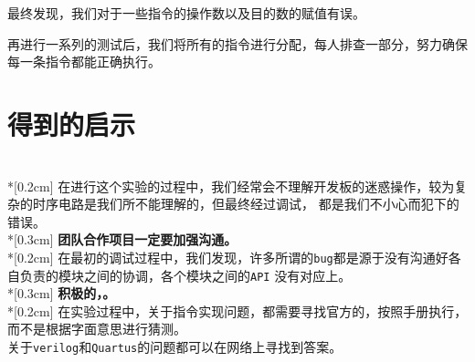 最终发现，我们对于一些指令的操作数以及目的数的赋值有误。

再进行一系列的测试后，我们将所有的指令进行分配，每人排查一部分，努力确保每一条指令都能正确执行。
\section{得到的启示}
\songti
{}
\\*[0.2cm]
\kaishu
在进行这个实验的过程中，我们经常会不理解开发板的迷惑操作，较为复杂的时序电路是我们所不能理解的，但最终经过调试，
都是我们不小心而犯下的错误。
\\*[0.3cm]
\songti
\textbf{团队合作项目一定要加强沟通。}
\\*[0.2cm]
\kaishu
在最初的调试过程中，我们发现，许多所谓的\texttt{bug}都是源于没有沟通好各自负责的模块之间的协调，各个模块之间的\texttt{API}
没有对应上。
\\*[0.3cm]
\songti
\textbf{积极的，。}
\\*[0.2cm]
\kaishu
在实验过程中，关于指令实现问题，都需要寻找官方的\href{http://www.cs.cornell.edu/courses/cs3410/2008fa/MIPS_Vol1.pdf}{}，按照手册执行，而不是根据字面意思进行猜测。
\\关于\texttt{verilog}和\texttt{Quartus}的问题都可以在网络上寻找到答案。
